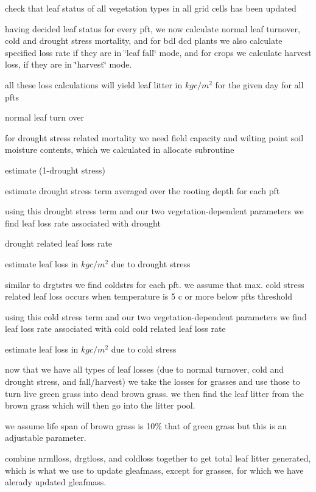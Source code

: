 check that leaf status of all vegetation types in all grid cells has been updated





having decided leaf status for every pft, we now calculate normal leaf turnover, cold and drought stress mortality, and for bdl dcd plants we also calculate specified loss rate if they are in \char`\"{}leaf fall\char`\"{} mode, and for crops we calculate harvest loss, if they are in \char`\"{}harvest\char`\"{} mode.

all these loss calculations will yield leaf litter in $kg c/m^2$ for the given day for all pfts

normal leaf turn over

for drought stress related mortality we need field capacity and wilting point soil moisture contents, which we calculated in allocate subroutine

estimate (1-\/drought stress)

estimate drought stress term averaged over the rooting depth for each pft

using this drought stress term and our two vegetation-\/dependent parameters we find leaf loss rate associated with drought

drought related leaf loss rate

estimate leaf loss in $kg c/m^2$ due to drought stress

similar to drgtstrs we find coldstrs for each pft. we assume that max. cold stress related leaf loss occurs when temperature is 5 c or more below pft\textquotesingle{}s threshold

using this cold stress term and our two vegetation-\/dependent parameters we find leaf loss rate associated with cold cold related leaf loss rate

estimate leaf loss in $kg c/m^2$ due to cold stress

now that we have all types of leaf losses (due to normal turnover, cold and drought stress, and fall/harvest) we take the losses for grasses and use those to turn live green grass into dead brown grass. we then find the leaf litter from the brown grass which will then go into the litter pool.

we assume life span of brown grass is 10\% that of green grass but this is an adjustable parameter.

combine nrmlloss, drgtloss, and coldloss together to get total leaf litter generated, which is what we use to update gleafmass, except for grasses, for which we have alerady updated gleafmass.